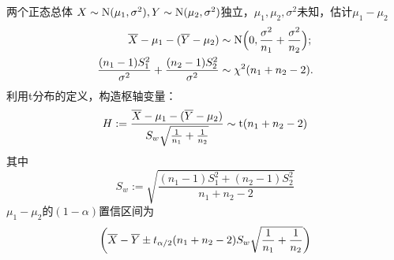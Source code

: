 \begin{example}{两个正态总体}{}
	$X\sim\operatorname{N}(\mu_1,\sigma^2),Y\sim\operatorname{N}(\mu_2,\sigma^2)$独立，$\mu_1,\mu_2,\sigma^2$未知，估计$\mu_1-\mu_2$
	\begin{align*}
		\overline{X}-\mu_1-(\overline{Y}-\mu_2)&\sim\operatorname{N}\Bigl(0,\frac{\sigma^2}{n_1}+\frac{\sigma^2}{n_2}\Bigr);\\
		\frac{(n_1-1)S_1^2}{\sigma^2}+\frac{(n_2-1)S_2^2}{\sigma^2}&\sim\chi^2(n_1+n_2-2).
	\end{align*}
	利用t分布的定义，构造枢轴变量：
	\[
		H:=\frac{\overline{X}-\mu_1-(\overline{Y}-\mu_2)}{S_w\sqrt{\frac1{n_1}+\frac1{n_2}}}\sim\mathrm t(n_1+n_2-2)
	\]
	其中 
	\[
		S_w:=\sqrt{\frac{(n_1-1)S_1^2+(n_2-1)S_2^2}{n_1+n_2-2}}
	\]
	$\mu_1-\mu_2$的$(1-\alpha)$置信区间为
	\[
		\left(\overline{X}-\overline{Y}\pm t_{\alpha/2}(n_1+n_2-2)S_w\sqrt{\frac1{n_1}+\frac1{n_2}}\right)
	\]
\end{example}

